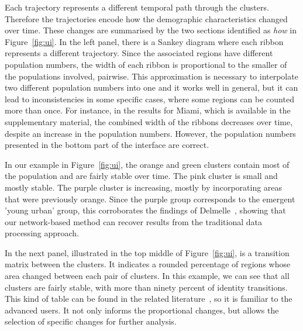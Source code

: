 Each trajectory represents a different temporal path through the clusters.
Therefore the trajectories encode how the demographic characteristics changed
over time. These changes are summarised by the two sections identified as
\emph{how} in Figure~\ref{fig:ui}. In the left panel, there is a Sankey diagram
where each ribbon represents a different trajectory. Since the associated
regions have different population numbers, the width of each ribbon is
proportional to the smaller of the populations involved, pairwise. This
approximation is necessary to interpolate two different population numbers into
one and it works well in general, but it can lead to inconsistencies in some
specific cases, where some regions can be counted more than once. For instance,
in the results for Miami, which is available in the supplementary material, the
combined width of the ribbons decreases over time, despite an increase in the
population numbers. However, the population numbers presented in the bottom part
of the interface are correct.


In our example in Figure~\ref{fig:ui}, the orange and green clusters contain
most of the population and are fairly stable over time. The pink cluster is
small and mostly stable. The purple cluster is increasing, mostly by
incorporating areas that were previously orange. Since the purple group
corresponds to the emergent 'young urban' group, this corroborates the findings
of Delmelle~\citep{Delmelle2016,Delmelle2017}, showing that our network-based
method can recover results from the traditional data processing approach.

In the next panel, illustrated in the top middle of Figure~\ref{fig:ui}, is a
transition matrix between the clusters. It indicates a rounded percentage of
regions whose area changed between each pair of clusters. In this example, we
can see that all clusters are fairly stable, with more than ninety percent of
identity transitions. This kind of table can be found in the related
literature~\citep{Delmelle2016}, so it is familiar to the advanced users. It not
only informs the proportional changes, but allows the selection of specific
changes for further analysis.


